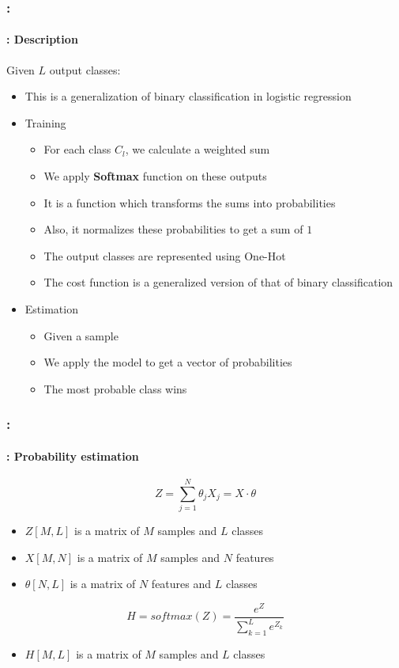\documentclass[xcolor=table]{beamer}
\begin{document}
\begin{frame}
	\frametitle{\insertshortsubtitle: \insertsection}
	\framesubtitle{\insertsubsection: Description}
	
	Given $L$ output classes:
	\begin{itemize}
		\item This is a generalization of binary classification in logistic regression
		\item Training
		\begin{itemize}
			\item For each class $C_{l}$, we calculate a weighted sum
			\item We apply \textbf{Softmax} function on these outputs
			\item It is a function which transforms the sums into probabilities
			\item Also, it normalizes these probabilities to get a sum of $1$
			\item The output classes are represented using One-Hot
			\item The cost function is a generalized version of that of binary classification
		\end{itemize}
		\item Estimation
		\begin{itemize}
			\item Given a sample
			\item We apply the model to get a vector of probabilities
			\item The most probable class wins
		\end{itemize}
	\end{itemize}
	
\end{frame}

\begin{frame}
	\frametitle{\insertshortsubtitle: \insertsection}
	\framesubtitle{\insertsubsection: Probability estimation}
	
	\[Z = \sum_{j=1}^{N} \theta_j X_j = X \cdot \theta\]
	\begin{itemize}
		\item $Z[M, L]$ is a matrix of $M$ samples and $L$ classes
		\item $X[M, N]$ is a matrix of $M$ samples and $N$ features
		\item $\theta[N, L]$ is a matrix of $N$ features and $L$ classes
	\end{itemize}
	
	\[H = softmax(Z) = \frac{e^{Z}}{\sum_{k=1}^{L} e^{Z_k}}\]
	
	\begin{itemize}
		\item $H[M, L]$ is a matrix of $M$ samples and $L$ classes
	\end{itemize}
	
\end{frame}
\end{document}
